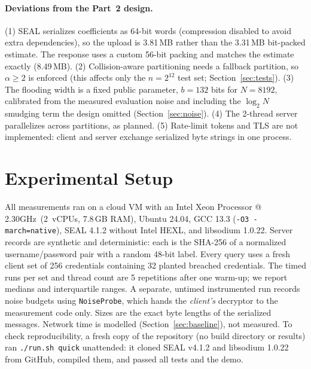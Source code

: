 \documentclass[11pt]{article}
\makeatletter
\newcommand{\CPU}{Intel Xeon Processor @ 2.30GHz}
\newcommand{\HWThreads}{2}
\makeatother
\begin{document}
\paragraph{Deviations from the Part~2 design.} (1) SEAL serializes coefficients as 64-bit words (compression disabled to avoid extra dependencies), so the upload is 3.81\,MB rather than the 3.31\,MB bit-packed estimate. The response uses a custom 56-bit packing and matches the estimate exactly (8.49\,MB). (2) Collision-aware partitioning needs a fallback partition, so $\alpha\ge2$ is enforced (this affects only the $n=2^{12}$ test set; Section~\ref{sec:tests}). (3) The flooding width is a fixed public parameter, $b=132$ bits for $N=8192$, calibrated from the measured evaluation noise and including the $\log_2 N$ smudging term the design omitted (Section~\ref{sec:noise}). (4) The 2-thread server parallelizes across partitions, as planned. (5) Rate-limit tokens and TLS are not implemented: client and server exchange serialized byte strings in one process.

\section{Experimental Setup}
All measurements ran on a cloud VM with an \CPU\ (\HWThreads\ vCPUs, 7.8\,GB RAM), Ubuntu 24.04, GCC 13.3 (\texttt{-O3 -march=native}), SEAL 4.1.2 without Intel HEXL, and libsodium 1.0.22. Server records are synthetic and deterministic: each is the SHA-256 of a normalized username/password pair with a random 48-bit label. Every query uses a fresh client set of 256 credentials containing 32 planted breached credentials. The timed runs per set and thread count are 5 repetitions after one warm-up; we report medians and interquartile ranges. A separate, untimed instrumented run records noise budgets using \texttt{NoiseProbe}, which hands the \emph{client's} decryptor to the measurement code only. Sizes are the exact byte lengths of the serialized messages. Network time is modelled (Section~\ref{sec:baseline}), not measured. To check reproducibility, a fresh copy of the repository (no build directory or results) ran \texttt{./run.sh quick} unattended: it cloned SEAL v4.1.2 and libsodium 1.0.22 from GitHub, compiled them, and passed all tests and the demo.
\end{document}
